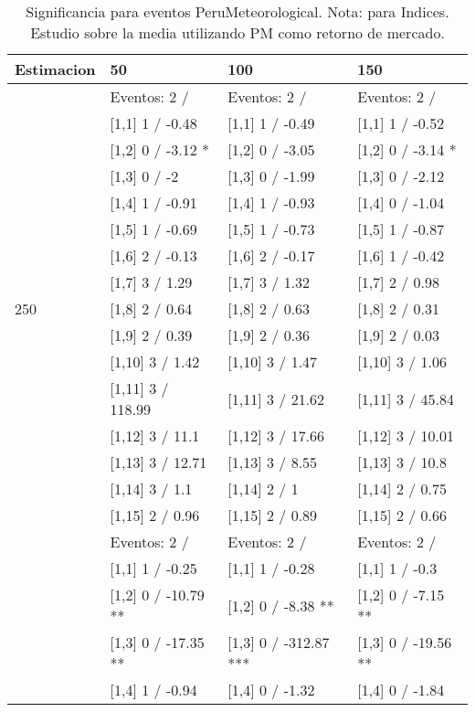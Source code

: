 \begin{table}

\caption{Significancia para eventos PeruMeteorological. Nota: para Indices. Estudio sobre la media utilizando PM como retorno de mercado.}
\centering
\begin{tabular}[t]{llll}
\toprule
Estimacion & 50 & 100 & 150\\
\midrule
 & Eventos:  2 / & Eventos:  2 / & Eventos:  2 /\\
 & {}[1,1] 1  / -0.48 & {}[1,1] 1  / -0.49 & {}[1,1] 1  / -0.52\\
 & {}[1,2] 0  / -3.12 * & {}[1,2] 0  / -3.05 & {}[1,2] 0  / -3.14 *\\
 & {}[1,3] 0  / -2 & {}[1,3] 0  / -1.99 & {}[1,3] 0  / -2.12\\
 & {}[1,4] 1  / -0.91 & {}[1,4] 1  / -0.93 & {}[1,4] 0  / -1.04\\
\addlinespace
 & {}[1,5] 1  / -0.69 & {}[1,5] 1  / -0.73 & {}[1,5] 1  / -0.87\\
 & {}[1,6] 2  / -0.13 & {}[1,6] 2  / -0.17 & {}[1,6] 1  / -0.42\\
 & {}[1,7] 3  / 1.29 & {}[1,7] 3  / 1.32 & {}[1,7] 2  / 0.98\\
250 & {}[1,8] 2  / 0.64 & {}[1,8] 2  / 0.63 & {}[1,8] 2  / 0.31\\
 & {}[1,9] 2  / 0.39 & {}[1,9] 2  / 0.36 & {}[1,9] 2  / 0.03\\
\addlinespace
 & {}[1,10] 3  / 1.42 & {}[1,10] 3  / 1.47 & {}[1,10] 3  / 1.06\\
 & {}[1,11] 3  / 118.99 & {}[1,11] 3  / 21.62 & {}[1,11] 3  / 45.84\\
 & {}[1,12] 3  / 11.1 & {}[1,12] 3  / 17.66 & {}[1,12] 3  / 10.01\\
 & {}[1,13] 3  / 12.71 & {}[1,13] 3  / 8.55 & {}[1,13] 3  / 10.8\\
 & {}[1,14] 3  / 1.1 & {}[1,14] 2  / 1 & {}[1,14] 2  / 0.75\\
\addlinespace
 & {}[1,15] 2  / 0.96 & {}[1,15] 2  / 0.89 & {}[1,15] 2  / 0.66\\
 & Eventos:  2 / & Eventos:  2 / & Eventos:  2 /\\
 & {}[1,1] 1  / -0.25 & {}[1,1] 1  / -0.28 & {}[1,1] 1  / -0.3\\
 & {}[1,2] 0  / -10.79 ** & {}[1,2] 0  / -8.38 ** & {}[1,2] 0  / -7.15 **\\
 & {}[1,3] 0  / -17.35 ** & {}[1,3] 0  / -312.87 *** & {}[1,3] 0  / -19.56 **\\
\addlinespace
 & {}[1,4] 1  / -0.94 & {}[1,4] 0  / -1.32 & {}[1,4] 0  / -1.84\\

\end{tabular}
\end{table}
